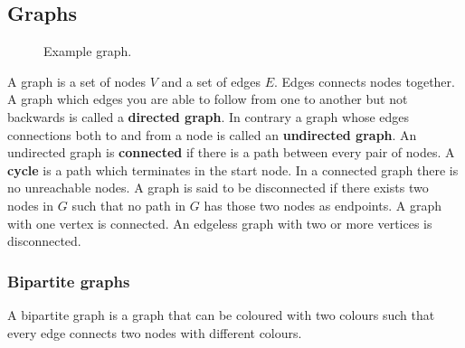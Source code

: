 \documentclass[12pt]{article} %
\begin{document}
\subsection{Graphs} %
\begin{figure}[H]
\caption{Example graph.}
\label{exGraph}
\end{figure}
A graph is a set of nodes $V$ and a set of edges $E$. Edges connects nodes together. A graph which edges you are able to follow from one to another but not backwards is called a \textbf{directed graph}. In contrary a graph whose edges connections both to and from a node is called an \textbf{undirected graph}. An undirected graph is \textbf{connected} if there is a path between every pair of nodes. A \textbf{cycle} is a path which terminates in the start node. In a connected graph there is no unreachable nodes. A graph is said to be disconnected if there exists two nodes in $G$ such that no path in $G$ has those two nodes as endpoints. A graph with one vertex is connected. An edgeless graph with two or more vertices is disconnected.

\subsubsection{Bipartite graphs}
A bipartite graph is a graph that can be coloured with two colours such that every edge connects two nodes with different colours.
\end{document}
